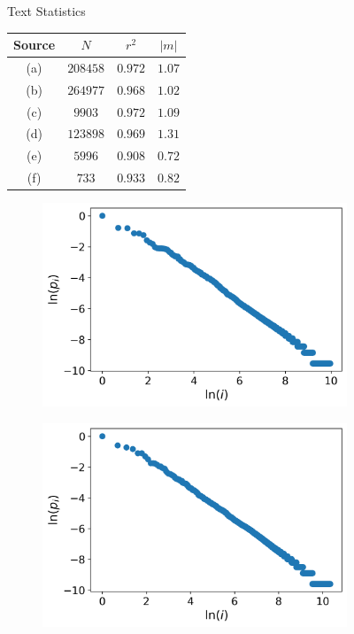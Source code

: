 \documentclass[10pt]{article}
\begin{document}
\begin{flushleft}
    \begin{figure}[ht]
    \begin{minipage}{0.35\linewidth}
        \centering
        \small
        Text Statistics
        
        \bigskip
        
        \begin{tabular}{@{}*{4}{c}@{}}
            \hline
        Source & $N$ & $r^2$ & $|m|$ \\ 
            \hline
        (a) & $208458$ & $0.972$ & $1.07$ \\
        (b) & $264977$ & $0.968$ & $1.02$ \\
        (c) & $9903$ & $0.972$ & $1.09$ \\
        (d) & $123898$ & $0.969$ & $1.31$ \\
        (e) & $5996$ & $0.908$ & $0.72$ \\
        (f) & $733$ & $0.933$ & $0.82$ \\
            \hline
        \end{tabular}
    \end{minipage}
    \begin{minipage}{0.65\linewidth}
        \begin{subfigure}{0.32\linewidth}
            \includegraphics[width=0.99\linewidth]{images/mobydick.png}
            \caption{}
        \end{subfigure}
        \begin{subfigure}{0.32\linewidth}
            \includegraphics[width=0.99\linewidth]{images/ulysses.png}

\end{subfigure}
\end{minipage}
\end{figure}
\end{flushleft}
\end{document}
